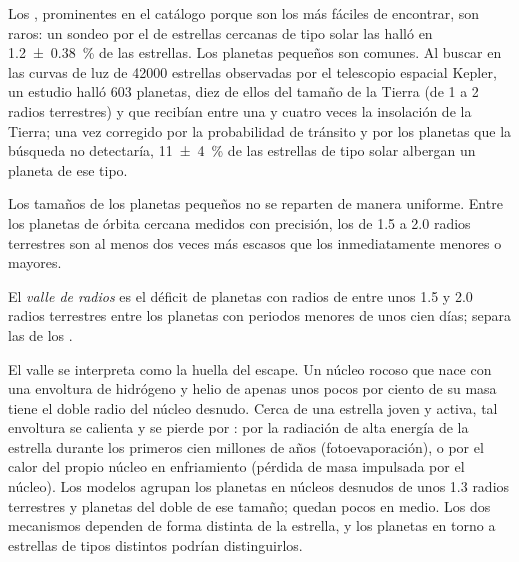 Los , prominentes en el catálogo porque son los más fáciles de
encontrar, son raros: un sondeo por el  de estrellas cercanas
de tipo solar las halló en \qty[separate-uncertainty=true]{1.2 \pm 0.38}{\percent} de las estrellas. Los planetas pequeños son
comunes. Al buscar en las curvas de luz de \num{42000} estrellas observadas por el
telescopio espacial Kepler, un estudio halló 603 planetas, diez de ellos del tamaño de la Tierra (de 1 a 2
radios terrestres) y que recibían entre una y cuatro veces la insolación de la
Tierra; una vez corregido por la probabilidad de tránsito y por los planetas que la
búsqueda no detectaría, \qty[separate-uncertainty=true]{11 \pm 4}{\percent} de las estrellas de tipo solar albergan un
planeta de ese tipo.

Los tamaños de los planetas pequeños no se reparten de manera uniforme. Entre los planetas de órbita cercana
medidos con precisión, los de 1.5 a 2.0 radios terrestres son al menos dos veces
más escasos que los inmediatamente menores o mayores.

\begin{definition}\label{def:b3:exoplanets:radius-valley}
El \emph{valle de radios} es el déficit de planetas
con radios de entre unos 1.5 y 2.0 radios terrestres entre los planetas con
periodos menores de unos cien días; separa las 
de los .
\end{definition}

El valle se interpreta como la huella del escape. Un núcleo rocoso que nace con una
envoltura de hidrógeno y helio de apenas unos pocos por ciento de su masa tiene el doble
radio del núcleo desnudo. Cerca de una estrella joven y activa, tal envoltura
se calienta y se pierde por : por la
radiación de alta energía de la estrella durante los primeros cien millones de años
(fotoevaporación), o por el calor del propio núcleo en enfriamiento (pérdida de masa
impulsada por el núcleo). Los modelos agrupan los planetas en núcleos desnudos de unos 1.3
radios terrestres y planetas del doble de ese tamaño; quedan pocos en medio.
Los dos mecanismos dependen de forma distinta de la estrella, y los planetas en torno a estrellas de
tipos distintos podrían distinguirlos.

